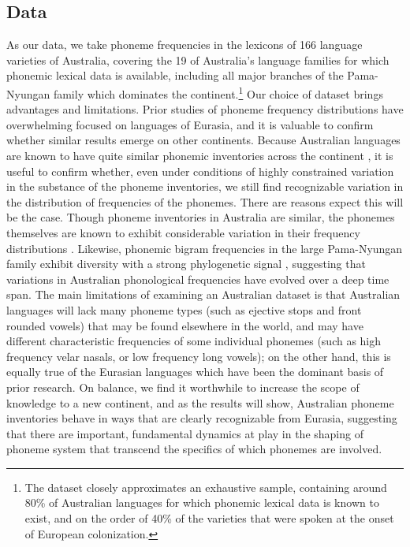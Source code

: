 \hypertarget{phon-freq-data}{%
\subsection{Data}\label{phon-freq-data}}

As our data, we take phoneme frequencies in the lexicons of 166 language varieties of Australia, covering the 19 of Australia's language families for which phonemic lexical data is available, including all major branches of the Pama-Nyungan family which dominates the continent.\footnote{The dataset closely approximates an exhaustive sample, containing around 80\% of Australian languages for which phonemic lexical data is known to exist, and on the order of 40\% of the varieties that were spoken at the onset of European colonization.} Our choice of dataset brings advantages and limitations. Prior studies of phoneme frequency distributions have overwhelming focused on languages of Eurasia, and it is valuable to confirm whether similar results emerge on other continents. Because Australian languages are known to have quite similar phonemic inventories across the continent \autocites{capell_new_1956}{dixon_languages_1980}{busby_distribution_1982}{hamilton_phonetic_1996}{baker_word_2014}{round_phonemic_2019}{round_segment_2020}, it is useful to confirm whether, even under conditions of highly constrained variation in the substance of the phoneme inventories, we still find recognizable variation in the distribution of frequencies of the phonemes. There are reasons expect this will be the case. Though phoneme inventories in Australia are similar, the phonemes themselves are known to exhibit considerable variation in their frequency distributions \autocites{gasser_revisiting_2014}{macklin-cordes_high-definition_2015}. Likewise, phonemic bigram frequencies in the large Pama-Nyungan family exhibit diversity with a strong phylogenetic signal \autocite[accepted]{macklin-cordes_phylogenetic_2020}, suggesting that variations in Australian phonological frequencies have evolved over a deep time span. The main limitations of examining an Australian dataset is that Australian languages will lack many phoneme types (such as ejective stops and front rounded vowels) that may be found elsewhere in the world, and may have different characteristic frequencies of some individual phonemes (such as high frequency velar nasals, or low frequency long vowels); on the other hand, this is equally true of the Eurasian languages which have been the dominant basis of prior research. On balance, we find it worthwhile to increase the scope of knowledge to a new continent, and as the results will show, Australian phoneme inventories behave in ways that are clearly recognizable from Eurasia, suggesting that there are important, fundamental dynamics at play in the shaping of phoneme system that transcend the specifics of which phonemes are involved.

